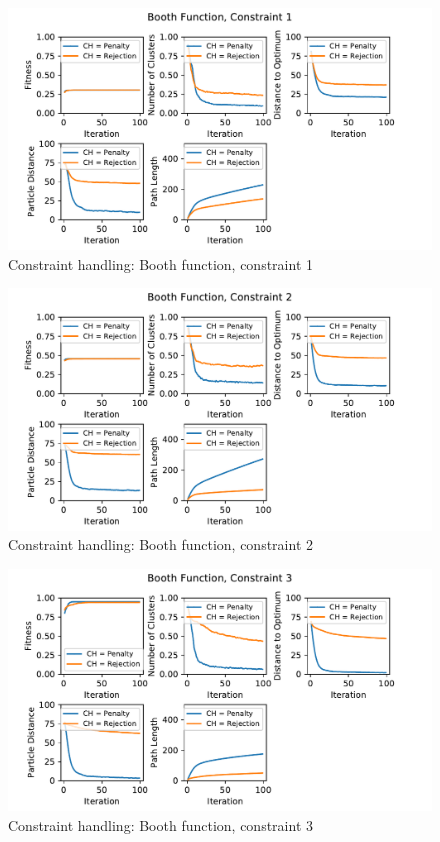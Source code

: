\documentclass[12pt]{article}
\begin{document}
\begin{figure}[h!]
	\centering
	\includegraphics[width=1\textwidth]{figures/ex6/ex6-2-Constraint_1.pdf}
	\caption{Constraint handling: Booth function, constraint 1}
	\label{fig:ex6-2-1}
\end{figure}
\begin{figure}[h!]
	\centering
	\includegraphics[width=1\textwidth]{figures/ex6/ex6-2-Constraint_2.pdf}
	\caption{Constraint handling: Booth function, constraint 2}
	\label{fig:ex6-2-2}
\end{figure}
\begin{figure}[h!]
	\centering
	\includegraphics[width=1\textwidth]{figures/ex6/ex6-2-Constraint_3.pdf}
	\caption{Constraint handling: Booth function, constraint 3}
	\label{fig:ex6-2-3}
\end{figure}
\end{document}
